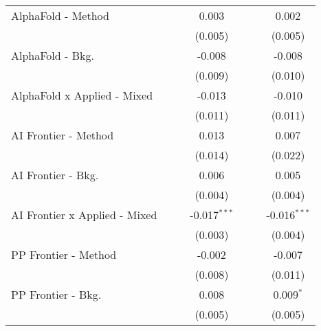 \begin{tabular}{lcccccc}
   AlphaFold - Method             &               &               & 0.003          &               &             & 0.002\\   
                                  &               &               & (0.005)        &               &             & (0.005)\\   
   AlphaFold - Bkg.               &               &               & -0.008         &               &             & -0.008\\   
                                  &               &               & (0.009)        &               &             & (0.010)\\   
   AlphaFold x Applied - Mixed    &               &               & -0.013         &               &             & -0.010\\   
                                  &               &               & (0.011)        &               &             & (0.011)\\   
   AI Frontier - Method           &               &               & 0.013          &               &             & 0.007\\   
                                  &               &               & (0.014)        &               &             & (0.022)\\   
   AI Frontier - Bkg.             &               &               & 0.006          &               &             & 0.005\\   
                                  &               &               & (0.004)        &               &             & (0.004)\\   
   AI Frontier x Applied - Mixed  &               &               & -0.017$^{***}$ &               &             & -0.016$^{***}$\\   
                                  &               &               & (0.003)        &               &             & (0.004)\\   
   PP Frontier - Method           &               &               & -0.002         &               &             & -0.007\\   
                                  &               &               & (0.008)        &               &             & (0.011)\\   
   PP Frontier - Bkg.             &               &               & 0.008          &               &             & 0.009$^{*}$\\   
                                  &               &               & (0.005)        &               &             & (0.005)\\   

\end{tabular}
